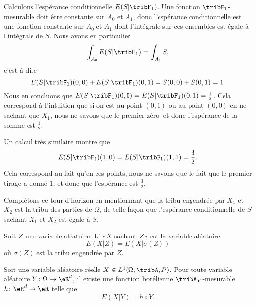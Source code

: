 \begin{example}
    Calculons l'espérance conditionnelle \( E(S|\tribF_1)\). Une fonction \( \tribF_1\)-mesurable doit être constante sur \( A_0\) et \( A_1\), donc l'espérance conditionnelle est une fonction constante sur \( A_0\) et \( A_1\) dont l'intégrale sur ces ensembles est égale à l'intégrale de \( S\). Nous avons en particulier
    \begin{equation}
        \int_{A_0}E(S|\tribF_1)=\int_{A_0}S,
    \end{equation}
    c'est à dire
    \begin{equation}
        E(S|\tribF_1)(0,0)+E(S|\tribF_1)(0,1)=S(0,0)+S(0,1)=1.
    \end{equation}
    Nous en concluons que \( E(S|\tribF_1)(0,0)=E(S|\tribF_1)(0,1)=\frac{ 1 }{2}\). Cela correspond à l'intuition que si on est au point \( (0,1)\) ou au point \( (0,0)\) en ne sachant que \( X_1\), nous ne savons que le premier zéro, et donc l'espérance de la somme est \( \frac{ 1 }{2}\).

    Un calcul très similaire montre que
    \begin{equation}
        E(S|\tribF_1)(1,0)=E(S|\tribF_1)(1,1)=\frac{ 3 }{2}.
    \end{equation}
    Cela correspond au fait qu'en ces points, nous ne savons que le fait que le premier tirage a donné \( 1\), et donc que l'espérance est \( \frac{ 3 }{2}\).

    Complétons ce tour d'horizon en mentionnant que la tribu engendrée par \( X_1\) et \( X_2\) est la tribu des parties de \( \Omega\), de telle façon que l'espérance conditionnelle de \( S\) sachant \( X_1\) et \( X_2\) est égale à \( S\).
\end{example}

\begin{definition}
    Soit \( Z\) une variable aléatoire. L' «\( X\) sachant \( Z\)» est la variable aléatoire
    \begin{equation}
        E(X|Z)=E(X|\sigma(Z))
    \end{equation}
    où \( \sigma(Z)\) est la tribu engendrée par \( Z\).
\end{definition}

\begin{proposition}
    Soit une variable aléatoire réelle \( X\in L^1(\Omega,\tribA,P)\). Pour toute variable aléatoire \( Y\colon \Omega\to \eR^d\), il existe une fonction borélienne \( \tribA_Y\)-mesurable \( h\colon \eR^d\to \eR\) telle que
    \begin{equation}
        E(X|Y)=h\circ Y.
    \end{equation}
\end{proposition}

